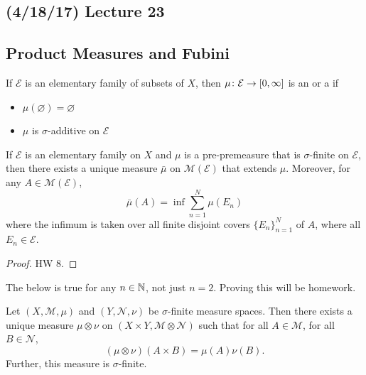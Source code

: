 \documentclass[11pt,leqno,oneside]{amsbook}
\numberwithin{thm}{section}
\newcommand{\M}{\mathcal{M}} %
\newcommand{\E}{\mathcal{E}}
\newcommand{\cN}{\mathcal{N}}
\newcommand{\s}{$\sigma$-} %
\newcommand{\x}{\times}
\newcommand{\ox}{\otimes}
\renewcommand{\emptyset}{\varnothing}
\begin{document}
\subsection*{(4/18/17) Lecture 23}
\subsection{Product Measures and Fubini}
\begin{defn}
  If $\E$ is an elementary family of subsets of $X$, then $\mu \from \E \to [0, \oo]$ is an  or a  if
  \begin{itemize}
    \item $\mu(\emptyset) = \emptyset$
    \item $\mu$ is \s additive on $\E$
  \end{itemize}
\end{defn}
\begin{thm}
  If $\E$ is an elementary family on $X$ and $\mu$ is a pre-premeasure that is \s finite on $\E$, then there exists a unique measure $\bar\mu$ on $\M(\E)$ that extends $\mu$.  Moreover, for any $A \in \M(\E)$, $$\bar\mu(A) = \inf\sum_{n=1}^N \mu(E_n)$$ where the infimum is taken over all finite disjoint covers $\{E_n\}_{n=1}^N$ of $A$, where all $E_n \in \E$.
\end{thm}
\begin{proof}
  HW 8.
\end{proof}
\begin{thm}
  The below is true for any $n \in {\mathbb N}$, not just $n = 2$.  Proving this will be homework.
\end{thm}
\begin{thm}
  Let $(X, \M, \mu)$ and $(Y, \cN, \nu)$ be \s finite measure spaces.
  Then there exists a unique measure $\mu \ox \nu$ on $(X \x Y, \M \ox
  \cN)$ such that for all $A \in \M$, for all $B \in \cN$, $$(\mu \ox \nu)(A \x B) = \mu(A)\nu(B).$$  Further, this measure is \s finite.
\end{thm}
\end{document}
